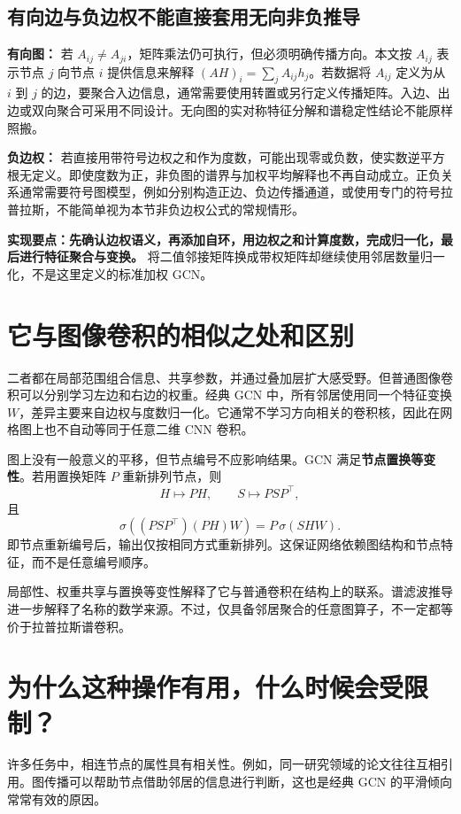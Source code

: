 \documentclass[UTF8,a4paper,11pt,fontset=fandol]{ctexart}
\begin{document}
\subsection{有向边与负边权不能直接套用无向非负推导}
\textbf{有向图：} 若 $A_{ij}\ne A_{ji}$，矩阵乘法仍可执行，但必须明确传播方向。本文按 $A_{ij}$ 表示节点 $j$ 向节点 $i$ 提供信息来解释 $(AH)_i=\sum_jA_{ij}h_j$。若数据将 $A_{ij}$ 定义为从 $i$ 到 $j$ 的边，要聚合入边信息，通常需要使用转置或另行定义传播矩阵。入边、出边或双向聚合可采用不同设计。无向图的实对称特征分解和谱稳定性结论不能原样照搬。

\textbf{负边权：} 若直接用带符号边权之和作为度数，可能出现零或负数，使实数逆平方根无定义。即使度数为正，非负图的谱界与加权平均解释也不再自动成立。正负关系通常需要符号图模型，例如分别构造正边、负边传播通道，或使用专门的符号拉普拉斯，不能简单视为本节非负边权公式的常规情形。

\textbf{实现要点：先确认边权语义，再添加自环，用边权之和计算度数，完成归一化，最后进行特征聚合与变换。} 将二值邻接矩阵换成带权矩阵却继续使用邻居数量归一化，不是这里定义的标准加权 GCN。

\section{它与图像卷积的相似之处和区别}
二者都在局部范围组合信息、共享参数，并通过叠加层扩大感受野。但普通图像卷积可以分别学习左边和右边的权重。经典 GCN 中，所有邻居使用同一个特征变换 $W$，差异主要来自边权与度数归一化。它通常不学习方向相关的卷积核，因此在网格图上也不自动等同于任意二维 CNN 卷积。

图上没有一般意义的平移，但节点编号不应影响结果。GCN 满足\textbf{节点置换等变性}。若用置换矩阵 $P$ 重新排列节点，则
\begin{equation}
H\mapsto PH,\qquad S\mapsto PSP^\top,
\end{equation}
且
\begin{equation}
\sigma\!\left((PSP^\top)(PH)W\right)
=P\,\sigma(SHW).
\end{equation}
即节点重新编号后，输出仅按相同方式重新排列。这保证网络依赖图结构和节点特征，而不是任意编号顺序。

局部性、权重共享与置换等变性解释了它与普通卷积在结构上的联系。谱滤波推导进一步解释了名称的数学来源。不过，仅具备邻居聚合的任意图算子，不一定都等价于拉普拉斯谱卷积。

\section{为什么这种操作有用，什么时候会受限制？}
许多任务中，相连节点的属性具有相关性。例如，同一研究领域的论文往往互相引用。图传播可以帮助节点借助邻居的信息进行判断，这也是经典 GCN 的平滑倾向常常有效的原因。
\end{document}

